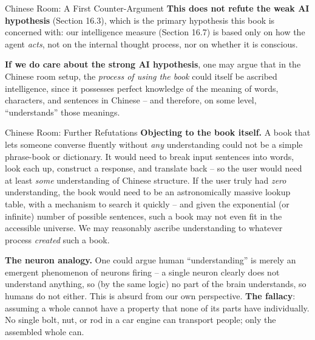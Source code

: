 \documentclass[aspectratio=169,10pt]{beamer}
\begin{document}
\begin{frame}{Chinese Room: A First Counter-Argument}
  \textbf{This does not refute the weak AI hypothesis} (Section 16.3),
  which is the primary hypothesis this book is concerned with: our
  intelligence measure (Section 16.7) is based only on how the agent
  \emph{acts}, not on the internal thought process, nor on whether it is
  conscious.

  \vspace{0.3em}
  \textbf{If we do care about the strong AI hypothesis}, one may argue that
  in the Chinese room setup, the \emph{process of using the book} could
  itself be ascribed intelligence, since it possesses perfect knowledge of
  the meaning of words, characters, and sentences in Chinese -- and
  therefore, on some level, ``understands'' those meanings.
\end{frame}

\begin{frame}{Chinese Room: Further Refutations}
  \textbf{Objecting to the book itself.} A book that lets someone converse
  fluently without \emph{any} understanding could not be a simple
  phrase-book or dictionary. It would need to break input sentences into
  words, look each up, construct a response, and translate back -- so the
  user would need at least \emph{some} understanding of Chinese structure.
  If the user truly had \emph{zero} understanding, the book would need to
  be an astronomically massive lookup table, with a mechanism to search it
  quickly -- and given the exponential (or infinite) number of possible
  sentences, such a book may not even fit in the accessible universe. We
  may reasonably ascribe understanding to whatever process \emph{created}
  such a book.

  \vspace{0.4em}
  \textbf{The neuron analogy.} One could argue human ``understanding'' is
  merely an emergent phenomenon of neurons firing -- a single neuron
  clearly does not understand anything, so (by the same logic) no part of
  the brain understands, so humans do not either. This is absurd from our
  own perspective. \textbf{The fallacy}: assuming a whole cannot have a
  property that none of its parts have individually. No single bolt, nut,
  or rod in a car engine can transport people; only the assembled whole
  can.
\end{frame}
\end{document}
